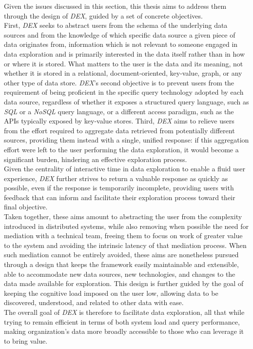Given the issues discussed in this section, this thesis aims to address
them through the design of \textit{DEX}, guided by a set of concrete objectives.\\
First, \textit{DEX} seeks to abstract users from the schema of the underlying data
sources and from the knowledge of which specific data source a given piece of data
originates from, information which is not relevant to someone engaged in data
exploration and is primarily interested in the data itself rather than in
how or where it is stored. What matters to the user is the data and its meaning,
not whether it is stored in a relational, document-oriented, key-value, graph,
or any other type of data store. \textit{DEX}'s second objective is to prevent
users from the requirement of being proficient in the specific query technology
adopted by each data source, regardless of whether it exposes a structured query
language, such as \textit{SQL} or a \textit{NoSQL} query language, or a
different access paradigm, such as the APIs typically exposed by key-value
stores. Third, \textit{DEX} aims to relieve users from the effort required to
aggregate data retrieved from potentially different sources, providing them
instead with a single, unified response: if this aggregation effort were
left to the user performing the data exploration, it would become a
significant burden, hindering an effective exploration process. \\
Given the centrality of interactive time in data exploration to enable a fluid
user experience, \textit{DEX} further strives to return a valuable response as
quickly as possible, even if the response is temporarily incomplete, providing
users with feedback that can inform and facilitate their exploration process
toward their final objective. \\ 
Taken together, these aims amount to abstracting the user from the complexity
introduced in distributed systems, while also removing when possible the need
for mediation with a technical team, freeing them to focus on work of greater
value to the system and avoiding the intrinsic latency of that mediation
process. When such mediation cannot be entirely avoided, these aims are
nonetheless pursued through a design that keeps the framework easily
maintainable and extensible, able to accommodate new data sources, new
technologies, and changes to the data made available for exploration.
This design is further guided by the goal of keeping the cognitive load imposed
on the user low, allowing data to be discovered, understood, and related to
other data with ease. \\
The overall goal of \textit{DEX} is therefore to facilitate data exploration,
all that while trying to remain efficient in terms of both system load and query
performance, making organization's data more broadly accessible to those who can 
leverage it to bring value.

